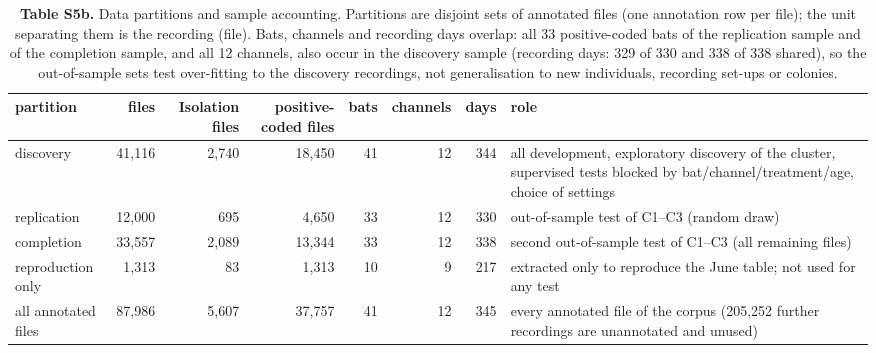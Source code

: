 \begin{table}[htbp]\centering\scriptsize
\caption{\textbf{Table S5b.} Data partitions and sample accounting. Partitions are disjoint sets of annotated files (one annotation row per file); the unit separating them is the recording (file). Bats, channels and recording days overlap: all 33 positive-coded bats of the replication sample and of the completion sample, and all 12 channels, also occur in the discovery sample (recording days: 329 of 330 and 338 of 338 shared), so the out-of-sample sets test over-fitting to the discovery recordings, not generalisation to new individuals, recording set-ups or colonies.}\label{tab:S5b}
\begin{adjustbox}{max width=\linewidth}
\begin{tabular}{lrrrrrrp{5.2cm}}
\toprule
partition & files & Isolation files & positive-coded files & bats & channels & days & role \\
\midrule
discovery & 41,116 & 2,740 & 18,450 & 41 & 12 & 344 & all development, exploratory discovery of the cluster, supervised tests blocked by bat/channel/treatment/age, choice of settings \\
replication & 12,000 & 695 & 4,650 & 33 & 12 & 330 & out-of-sample test of C1--C3 (random draw) \\
completion & 33,557 & 2,089 & 13,344 & 33 & 12 & 338 & second out-of-sample test of C1--C3 (all remaining files) \\
reproduction only & 1,313 & 83 & 1,313 & 10 & 9 & 217 & extracted only to reproduce the June table; not used for any test \\
all annotated files & 87,986 & 5,607 & 37,757 & 41 & 12 & 345 & every annotated file of the corpus (205,252 further recordings are unannotated and unused) \\
\bottomrule
\end{tabular}
\end{adjustbox}
\end{table}
